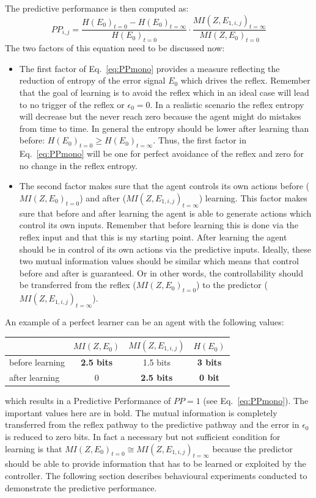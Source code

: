 The predictive performance is then computed as:
\begin{equation}
PP_{i,j}= \frac{H(E_0)_{t=0}-H(E_0)_{t=\infty}}{H(E_0)_{t=0}}\cdot 
\frac{MI(Z,E_{1,i,j})_{t=\infty}}{MI(Z,E_0)_{t=0}}
\label{eq:PPmono}
\end{equation}
The two factors of this equation need to be discussed now:
\begin{itemize}
\item The first factor of Eq.~\ref{eq:PPmono} provides a measure
  reflecting the reduction of entropy of the error signal $E_{0}$
  which drives the reflex. Remember that the goal of learning is to
  avoid the reflex which in an ideal case will lead to no trigger of
  the reflex or $\epsilon_0=0$. In a realistic scenario the reflex entropy
  will decrease but the never reach zero because the agent might do
  mistakes from time to time.  In general the entropy should be lower
  after learning than before: $H(E_0)_{t=0}\geq H(E_0)_{t=\infty}$.
  Thus, the first factor in Eq.~\ref{eq:PPmono} will be one for
  perfect avoidance of the reflex and zero for no change in the reflex
  entropy.
\item The second factor makes sure that the agent controls its own
  actions before ($MI(Z,E_0)_{t=0}$) and after
  ($MI(Z,E_{1,i,j})_{t=\infty}$) learning. This factor makes sure that
  before and after learning the agent is able to generate actions
  which control its own inputs. Remember that before learning this is
  done via the reflex input and that this is my starting point. After
  learning the agent should be in control of its own actions via the
  predictive inputs.  Ideally, these two mutual information values
  should be similar which means that control before and after is
  guaranteed. Or in other words, the controllability should be
  transferred from the reflex ($MI(Z,E_0)_{t=0}$) to the predictor
  ($MI(Z,E_{1,i,j})_{t=\infty}$).
\end{itemize}

An example of a perfect learner can be an agent with the following values:

\begin{center}
  \begin{tabular}{| l | c | c | c |}
    \hline
		& $MI(Z,E_0)$ & $MI(Z,E_{1,i,j})$ & $H(E_{0})$\\ \hline
    before learning & \textbf{2.5 bits} & 1.5 bits & \textbf{3 bits} \\ \hline
    after learning & 0 & \textbf{2.5 bits } & \textbf{0 bit}\\ \hline
  \end{tabular}
\end{center}
which results in a Predictive Performance of $PP=1$ (see Eq.~\ref{eq:PPmono}).
The important values here are in bold. The mutual information is completely transferred
from the reflex pathway to the predictive pathway and the error in $\epsilon_0$ is reduced 
to zero bits. In fact a necessary but not sufficient condition for learning is that 
$MI(Z,E_0)_{t=0} \cong MI(Z,E_{1,i,j})_{t=\infty}$ because the predictor should be able to
provide information that has to be learned or exploited by the controller.
The following section describes behavioural experiments conducted to demonstrate 
the predictive performance.

